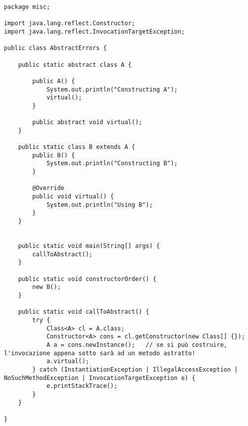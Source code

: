 \begin{lstlisting}
package misc;

import java.lang.reflect.Constructor;
import java.lang.reflect.InvocationTargetException;

public class AbstractErrors {

    public static abstract class A {

        public A() {
            System.out.println("Constructing A");
            virtual();
        }

        public abstract void virtual();
    }

    public static class B extends A {
        public B() {
            System.out.println("Constructing B");
        }

        @Override
        public void virtual() {
            System.out.println("Using B");
        }
    }


    public static void main(String[] args) {
        callToAbstract();
    }

    public static void constructorOrder() {
        new B();
    }

    public static void callToAbstract() {
        try {
            Class<A> cl = A.class;
            Constructor<A> cons = cl.getConstructor(new Class[] {});
            A a = cons.newInstance();   // se si può costruire, l'invocazione appena sotto sarà ad un metodo astratto!
            a.virtual();
        } catch (InstantiationException | IllegalAccessException | NoSuchMethodException | InvocationTargetException e) {
            e.printStackTrace();
        }
    }

}
\end{lstlisting}